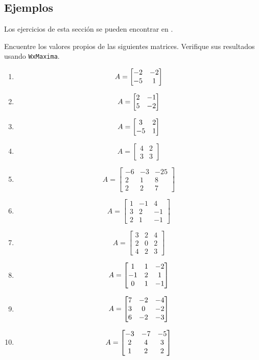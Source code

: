 \subsection*{Ejemplos}

Los ejercicios de esta sección se pueden encontrar en \cite[sec. 6.3]{G}.

\begin{problema}
\label{exe:diagonal}
 Encuentre los valores propios de las siguientes matrices. Verifique sus resultados usando \texttt{WxMaxima}.
 \begin{enumerate}

 \item $$
A=\begin{bmatrix}-2&-2\\-5&1\end{bmatrix}
 $$

 \item$$A=\begin{bmatrix}2&-1\\5&-2\end{bmatrix}$$

 \item$$A=\begin{bmatrix}3&2\\-5&1\end{bmatrix}$$
 
 \item $$A=\begin{bmatrix}
            4 & 2 \\
            3 & 3
           \end{bmatrix}
$$

\item$$
A=\begin{bmatrix}
   -6 & -3 & -25 \\
   2 & 1 & 8 \\
   2 & 2 & 7
  \end{bmatrix}
$$

\item $$
A=\begin{bmatrix}
   1 & -1 & 4 \\
   3 & 2 & -1 \\
   2 & 1 & -1
  \end{bmatrix}
$$
\item $$
A=\begin{bmatrix}
   3 & 2 & 4 \\
   2 & 0 & 2 \\
   4 & 2 & 3
  \end{bmatrix}
$$

\item$$A=\begin{bmatrix}1&1&-2\\-1&2&1\\0&1&-1\end{bmatrix}$$

\item$$A=\begin{bmatrix}7&-2&-4\\3&0&-2\\6&-2&-3\end{bmatrix}$$

\item$$A=\begin{bmatrix}-3&-7&-5\\2&4&3\\1&2&2\end{bmatrix}$$
\end{enumerate}
\end{problema}



